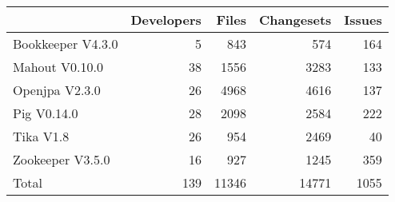 \begin{tabular}{lrrrr}
\toprule
{} &  Developers &  Files &  Changesets &  Issues \\
\midrule
Bookkeeper V4.3.0 &           5 &    843 &         574 &     164 \\
Mahout V0.10.0    &          38 &   1556 &        3283 &     133 \\
Openjpa V2.3.0    &          26 &   4968 &        4616 &     137 \\
Pig V0.14.0       &          28 &   2098 &        2584 &     222 \\
Tika V1.8         &          26 &    954 &        2469 &      40 \\
Zookeeper V3.5.0  &          16 &    927 &        1245 &     359 \\
\midrule
Total             &         139 &  11346 &       14771 &    1055 \\
\bottomrule
\end{tabular}